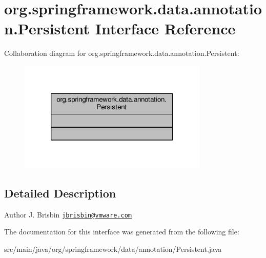 \hypertarget{interfaceorg_1_1springframework_1_1data_1_1annotation_1_1Persistent}{}\section{org.\+springframework.\+data.\+annotation.\+Persistent Interface Reference}
\label{interfaceorg_1_1springframework_1_1data_1_1annotation_1_1Persistent}


Collaboration diagram for org.\+springframework.\+data.\+annotation.\+Persistent\+:\nopagebreak
\begin{figure}[H]
\begin{center}
\leavevmode
\includegraphics[width=256pt]{interfaceorg_1_1springframework_1_1data_1_1annotation_1_1Persistent__coll__graph}
\end{center}
\end{figure}


\subsection{Detailed Description}
\begin{DoxyAuthor}{Author}
J. Brisbin \href{mailto:jbrisbin@vmware.com}{\tt jbrisbin@vmware.\+com} 
\end{DoxyAuthor}


The documentation for this interface was generated from the following file\+:\begin{DoxyCompactItemize}
\item 
src/main/java/org/springframework/data/annotation/Persistent.\+java\end{DoxyCompactItemize}
